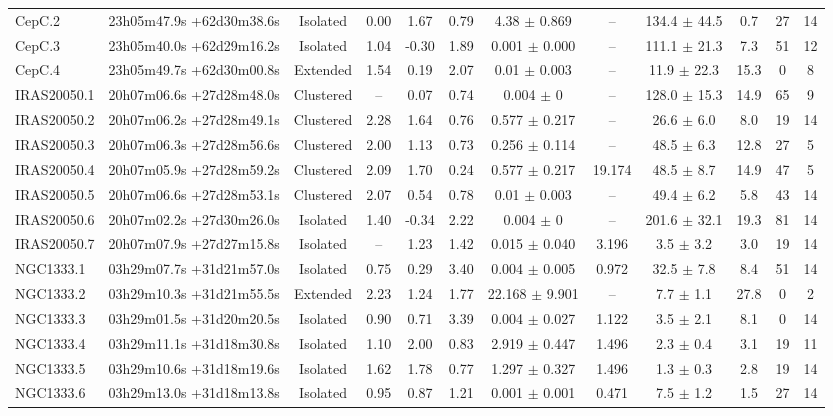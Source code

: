 \begin{landscape}
\begin{longtable}{lccccccccccc}
CepC.2	&	23h05m47.9s +62d30m38.6s	&	Isolated	&	0.00	&	1.67	&	0.79	&	4.38	$\pm$	0.869	&	--	&	134.4	$\pm$	44.5	&	0.7	&	27	&	14	\\
CepC.3	&	23h05m40.0s +62d29m16.2s	&	Isolated	&	1.04	&	-0.30	&	1.89	&	0.001	$\pm$	0.000	&	--	&	111.1	$\pm$	21.3	&	7.3	&	51	&	12	\\
CepC.4	&	23h05m49.7s +62d30m00.8s	&	Extended	&	1.54	&	0.19	&	2.07	&	0.01	$\pm$	0.003	&	--	&	11.9	$\pm$	22.3	&	15.3	&	0	&	8	\\
IRAS20050.1	&	20h07m06.6s +27d28m48.0s	&	Clustered	&	--	&	0.07	&	0.74	&	0.004	$\pm$	0	&	--	&	128.0	$\pm$	15.3	&	14.9	&	65	&	9	\\
IRAS20050.2	&	20h07m06.2s +27d28m49.1s	&	Clustered	&	2.28	&	1.64	&	0.76	&	0.577	$\pm$	0.217	&	--	&	26.6	$\pm$	6.0	&	8.0	&	19	&	14	\\
IRAS20050.3	&	20h07m06.3s +27d28m56.6s	&	Clustered	&	2.00	&	1.13	&	0.73	&	0.256	$\pm$	0.114	&	--	&	48.5	$\pm$	6.3	&	12.8	&	27	&	5	\\
IRAS20050.4	&	20h07m05.9s +27d28m59.2s	&	Clustered	&	2.09	&	1.70	&	0.24	&	0.577	$\pm$	0.217	&	19.174	&	48.5	$\pm$	8.7	&	14.9	&	47	&	5	\\
IRAS20050.5	&	20h07m06.6s +27d28m53.1s	&	Clustered	&	2.07	&	0.54	&	0.78	&	0.01	$\pm$	0.003	&	--	&	49.4	$\pm$	6.2	&	5.8	&	43	&	14	\\
IRAS20050.6	&	20h07m02.2s +27d30m26.0s	&	Isolated	&	1.40	&	-0.34	&	2.22	&	0.004	$\pm$	0	&	--	&	201.6	$\pm$	32.1	&	19.3	&	81	&	14	\\
IRAS20050.7	&	20h07m07.9s +27d27m15.8s	&	Isolated	&	--	&	1.23	&	1.42	&	0.015	$\pm$	0.040	&	3.196	&	3.5	$\pm$	3.2	&	3.0	&	19	&	14	\\
NGC1333.1	&	03h29m07.7s +31d21m57.0s	&	Isolated	&	0.75	&	0.29	&	3.40	&	0.004	$\pm$	0.005	&	0.972	&	32.5	$\pm$	7.8	&	8.4	&	51	&	14	\\
NGC1333.2	&	03h29m10.3s +31d21m55.5s	&	Extended	&	2.23	&	1.24	&	1.77	&	22.168	$\pm$	9.901	&	--	&	7.7	$\pm$	1.1	&	27.8	&	0	&	2	\\
NGC1333.3	&	03h29m01.5s +31d20m20.5s	&	Isolated	&	0.90	&	0.71	&	3.39	&	0.004	$\pm$	0.027	&	1.122	&	3.5	$\pm$	2.1	&	8.1	&	0	&	14	\\
NGC1333.4	&	03h29m11.1s +31d18m30.8s	&	Isolated	&	1.10	&	2.00	&	0.83	&	2.919	$\pm$	0.447	&	1.496	&	2.3	$\pm$	0.4	&	3.1	&	19	&	11	\\
NGC1333.5	&	03h29m10.6s +31d18m19.6s	&	Isolated	&	1.62	&	1.78	&	0.77	&	1.297	$\pm$	0.327	&	1.496	&	1.3	$\pm$	0.3	&	2.8	&	19	&	14	\\
NGC1333.6	&	03h29m13.0s +31d18m13.8s	&	Isolated	&	0.95	&	0.87	&	1.21	&	0.001	$\pm$	0.001	&	0.471	&	7.5	$\pm$	1.2	&	1.5	&	27	&	14	\\

\end{longtable}
\end{landscape}
